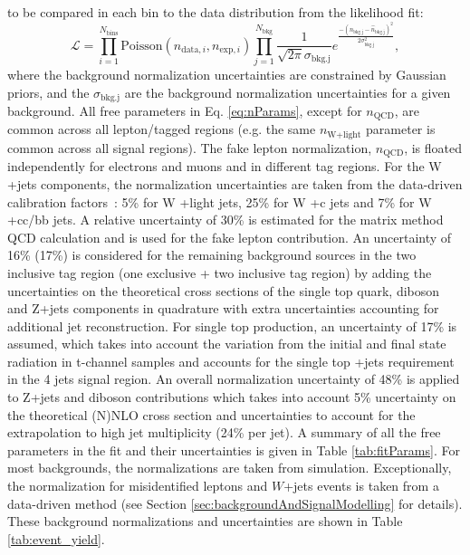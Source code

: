 to be compared in each bin to the data distribution from the likelihood fit:
\begin{equation}
{\mathscr{L}}=\prod\limits_{i=1}^{N_{\text{bins}}} \textrm{Poisson}(n_{\textrm{data},i}, n_{\textrm{exp},i}) \prod\limits_{j=1}^{N_{\text{bkg}}}\frac{1}{\sqrt{2\pi}\sigma_{\textrm{bkg.j}}}e^{\frac{-(n_{\textrm{bkg.j}}-\hat n_{\textrm{bkg.j}})^2}{2\sigma ^{2}_{\textrm{bkg.j}}}},
\label{eq:LHFit}
\end{equation}
where the background normalization uncertainties are constrained by Gaussian priors, and the $\sigma_{\textrm{bkg.j}}$ are the background normalization uncertainties for a given background. All free parameters in Eq. \ref{eq:nParams}, except for $n_{\text{QCD}}$, are common across all lepton/\bt tagged regions (e.g. the same $n_{\textrm{W+light}}$ parameter is common across all signal regions). The fake lepton normalization, $n_{\textrm{QCD}}$, is floated independently for electrons and muons and in different \bt tag regions. For the W +jets components, the normalization uncertainties are taken from the data-driven calibration factors~\cite{Juste:1647184}: 5\% for W +light jets, 25\% for W +c jets and 7\% for W +cc/bb jets. A relative uncertainty of 30\% is estimated for the matrix method QCD calculation\cite{MatrixMethod} and is used for the fake lepton contribution. An uncertainty of 16\% (17\%) is considered for the remaining background sources in the two inclusive \bt tag region (one exclusive + two inclusive \bt tag region) by adding the uncertainties on the theoretical cross sections of the single top quark, diboson and Z+jets components in quadrature with extra uncertainties accounting for additional jet reconstruction. For single top production, an uncertainty of 17\% is assumed, which takes into account the variation from the initial and final state radiation in t-channel samples and accounts for the single top +jets requirement in the 4 jets signal region. An overall normalization uncertainty of 48\% is applied to Z+jets and diboson contributions which takes into account 5\% uncertainty on the theoretical (N)NLO cross section and uncertainties to account for the extrapolation to high jet multiplicity (24\% per jet). A summary of all the free parameters in the fit and their uncertainties is given in Table \ref{tab:fitParams}. For most backgrounds, the normalizations are taken from simulation. Exceptionally, the normalization for misidentified leptons and $W$+jets events is taken from a data-driven method (see Section \ref{sec:backgroundAndSignalModelling} for details). These background normalizations and uncertainties are shown in Table \ref{tab:event_yield}.

